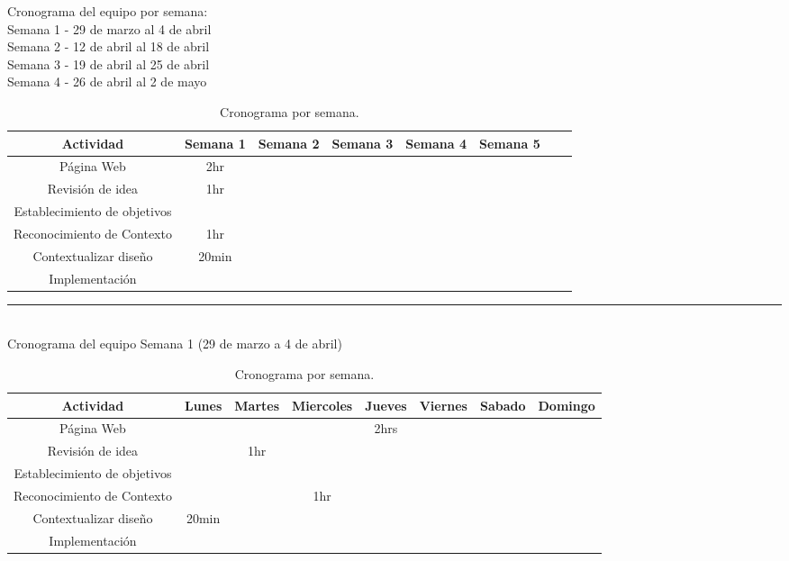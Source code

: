 \documentclass{article}
\begin{document}
Cronograma del equipo por semana:\\
Semana 1 - 29 de marzo al 4 de abril \\
Semana 2 - 12 de abril al 18 de abril \\
Semana 3 - 19 de abril al 25 de abril \\
Semana 4 - 26 de abril al 2 de mayo \\
\begin{center}
  \begin{table}[H]
    \centering
    \begin{tabular}{| c | c | c | c | c | c | c | c | }
      \hline
      Actividad & Semana 1 & Semana 2 & Semana 3 & Semana 4 & Semana 5  \\
      \hline
      Página Web & 2hr & & & &  \\ \hline
      Revisión de idea & 1hr & & & &    \\ \hline
      Establecimiento de objetivos &  & &  & &   \\ \hline
      Reconocimiento de Contexto & 1hr & &  & &   \\ \hline
      Contextualizar diseño & 20min & &  & &   \\ \hline
      Implementación & & &  & &   \\ \hline
    \end{tabular}
    \caption{Cronograma por semana.}
    \label{tabla:horarios}
  \end{table}
\end{center}

\rule{0.8\textwidth}{.8pt}\\

Cronograma del equipo Semana 1 (29 de marzo a 4 de abril)
\\

\begin{center}
  \begin{table}[H]
    \centering
    \begin{tabular}{| c | c | c | c | c | c | c | c | }
      \hline
      Actividad & Lunes  & Martes  & Miercoles  & Jueves  & Viernes  & Sabado & Domingo  \\
      \hline
      Página Web & & & & 2hrs & & & \\ \hline
      Revisión de idea & & 1hr & & & & &    \\ \hline
      Establecimiento de objetivos &  & &  & & & &  \\ \hline
      Reconocimiento de Contexto & & & 1hr & & & & \\ \hline
      Contextualizar diseño & 20min & &  & & & &  \\ \hline
      Implementación &  & &  & & & &  \\ \hline
    \end{tabular}
    \caption{Cronograma por semana.}
    \label{tabla:horarios}
  \end{table}
\end{center}
\end{document}
